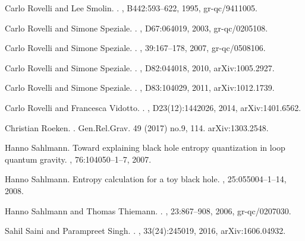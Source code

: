 \documentclass[aps, nofootinbib,superscriptaddress,12pt]{revtex4-2}
\begin{document}
\begin{thebibliography}{100}
Carlo Rovelli and Lee Smolin.
.
, B442:593--622, 1995, gr-qc/9411005.

Carlo Rovelli and Simone Speziale.
.
, D67:064019, 2003, gr-qc/0205108.

Carlo Rovelli and Simone Speziale.
.
, 39:167--178, 2007, gr-qc/0508106.

Carlo Rovelli and Simone Speziale.
.
, D82:044018, 2010, arXiv:1005.2927.

Carlo Rovelli and Simone Speziale.
.
, D83:104029, 2011, arXiv:1012.1739.

Carlo Rovelli and Francesca Vidotto.
.
, D23(12):1442026, 2014, arXiv:1401.6562.

Christian Roeken.
.
\newblock Gen.Rel.Grav. 49 (2017) no.9, 114.
\newblock  arXiv:1303.2548.

Hanno Sahlmann.
\newblock Toward explaining black hole entropy quantization in loop quantum
  gravity.
, 76:104050--1--7, 2007.

Hanno Sahlmann.
\newblock Entropy calculation for a toy black hole.
, 25:055004--1--14, 2008.

Hanno Sahlmann and Thomas Thiemann.
.
, 23:867--908, 2006, gr-qc/0207030.

Sahil Saini and Parampreet Singh.
.
, 33(24):245019, 2016, arXiv:1606.04932.


\end{thebibliography}
\end{document}
